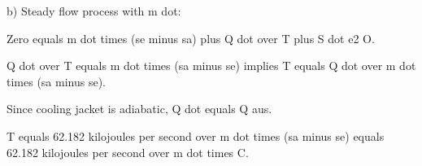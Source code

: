 b) Steady flow process with m dot:

Zero equals m dot times (se minus sa) plus Q dot over T plus S dot e2 O.

Q dot over T equals m dot times (sa minus se) implies T equals Q dot over m dot times (sa minus se).

Since cooling jacket is adiabatic, Q dot equals Q aus.

T equals 62.182 kilojoules per second over m dot times (sa minus se) equals 62.182 kilojoules per second over m dot times C.